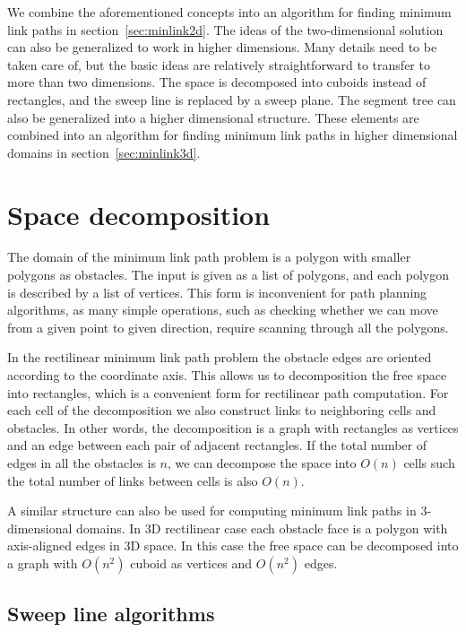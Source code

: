 \documentclass[english,gradu]{tktltiki2018}
\begin{document}
We combine the aforementioned concepts into an algorithm for finding minimum link paths in section~\ref{sec:minlink2d}.
The ideas of the two-dimensional solution can also be generalized to work in higher dimensions.
Many details need to be taken care of, but the basic ideas are relatively straightforward to transfer to more than two dimensions.
The space is decomposed into cuboids instead of rectangles, and the sweep line is replaced by a sweep plane.
The segment tree can also be generalized into a higher dimensional structure.
These elements are combined into an algorithm for finding minimum link paths in higher dimensional domains in section~\ref{sec:minlink3d}.



\section{Space decomposition}\label{sec:decomposition}

The domain of the minimum link path problem is a polygon with smaller polygons as obstacles.
The input is given as a list of polygons, and each polygon is described by a list of vertices.
This form is inconvenient for path planning algorithms, as many simple operations, such as checking whether we can move from a given point to given direction, require scanning through all the polygons.

In the rectilinear minimum link path problem the obstacle edges are oriented according to the coordinate axis.
This allows us to decomposition the free space into rectangles, which is a convenient form for rectilinear path computation.
For each cell of the decomposition we also construct links to neighboring cells and obstacles.
In other words, the decomposition is a graph with rectangles as vertices and an edge between each pair of adjacent rectangles.
If the total number of edges in all the obstacles is $n$, we can decompose the space into $O(n)$ cells such the total number of links between cells is also $O(n)$.

A similar structure can also be used for computing minimum link paths in 3-dimensional domains.
In 3D rectilinear case each obstacle face is a polygon with axis-aligned edges in 3D space.
In this case the free space can be decomposed into a graph with $O(n^2)$ cuboid as vertices and $O(n^2)$ edges.


\subsection{Sweep line algorithms}\label{sec:sweep}
\end{document}
